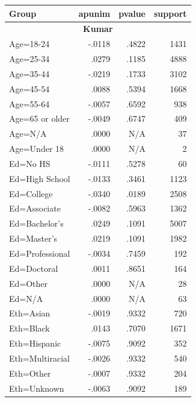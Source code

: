\documentclass[11pt]{article}
\theoremstyle{definition}
\theoremstyle{plain}
\begin{document}
\begin{table}[t]
	\centering
	\scriptsize 
	\begin{tabularx}{\columnwidth}{X r r r}
		\toprule
		\textbf{Group} & \textbf{apunim} & \textbf{pvalue} & \textbf{support} \\
		\midrule
		
		\multicolumn{4}{c}{\textbf{Kumar}} \\
		\midrule
		\rowcolor{gray!15}
		Age=18-24 & -.0118 & .4822 & 1431 \\
		Age=25-34 & .0279 & .1185 & 4888 \\
		\rowcolor{gray!15}
		Age=35-44 & -.0219 & .1733 & 3102 \\
		Age=45-54 & .0088 & .5394 & 1668 \\
		\rowcolor{gray!15}
		Age=55-64 & -.0057 & .6592 & 938 \\
		\rowcolor{gray!15}
		Age=65 or older & -.0049 & .6747 & 409 \\
		Age=N/A & .0000 & N/A & 37 \\
		Age=Under 18 & .0000 & N/A & 2 \\
		\rowcolor{gray!15}
		Ed=No HS & -.0111 & .5278 & 60 \\
		\rowcolor{gray!15}
		Ed=High School & -.0133 & .3461 & 1123 \\
		Ed=College & -.0340 & .0189 & 2508 \\
		\rowcolor{gray!15}
		Ed=Associate & -.0082 & .5963 & 1362 \\
		Ed=Bachelor's & .0249 & .1091 & 5007 \\
		Ed=Master's & .0219 & .1091 & 1982 \\
		\rowcolor{gray!15}
		Ed=Professional & -.0034 & .7459 & 192 \\
		Ed=Doctoral & .0011 & .8651 & 164 \\
		Ed=Other & .0000 & N/A & 28 \\
		Ed=N/A & .0000 & N/A & 63 \\
		\rowcolor{gray!15}
		Eth=Asian & -.0019 & .9332 & 720 \\
		Eth=Black & .0143 & .7070 & 1671 \\
		\rowcolor{gray!15}
		Eth=Hispanic & -.0075 & .9092 & 352 \\
		\rowcolor{gray!15}
		Eth=Multiracial & -.0026 & .9332 & 540 \\
		\rowcolor{gray!15}
		Eth=Other & -.0007 & .9332 & 204 \\
		\rowcolor{gray!15}
		Eth=Unknown & -.0063 & .9092 & 189 \\

\end{tabularx}
\end{table}
\end{document}

